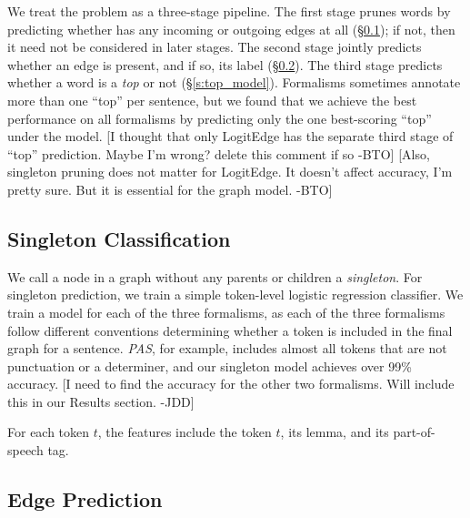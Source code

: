 \documentclass[11pt]{article}
\newcommand{\bocomment}[1]{\textcolor{Bittersweet}{[#1 -BTO]}}
\newcommand{\jdcomment}[1]{\textcolor{NavyBlue}{[#1 -JDD]}}
\begin{document}
We treat the problem as a three-stage pipeline.
The first stage prunes words by predicting whether has any incoming or
outgoing edges at all (\S\ref{s:singleton_model}); if not, then it need not be 
considered in later stages.
The second stage jointly predicts whether an edge is
present, and if so, its label (\S\ref{s:edge_model}).
The third stage predicts whether a word is a \emph{top} or not
(\S\ref{s:top_model}).
Formalisms sometimes annotate more than one ``top'' per sentence, but we
found that we achieve the best performance on all formalisms by predicting only
the one best-scoring ``top'' under the model.
\bocomment{I thought that only LogitEdge has the separate third stage of ``top'' prediction. Maybe I'm wrong? delete this comment if so}
\bocomment{Also, singleton pruning does not matter for LogitEdge.  It doesn't affect accuracy, I'm pretty sure.  But it is essential for the graph model.}


\subsection{Singleton Classification} \label{s:singleton_model}

We call a node in a graph without any parents or children a \emph{singleton}.
For singleton prediction, we train a simple token-level logistic regression
classifier.
We train a model for each of the three formalisms, as each of the three
formalisms follow different conventions determining whether a token is
included in the final graph for a sentence.
\emph{PAS}, for example, includes almost all tokens that are not
punctuation or a determiner, and our singleton model achieves over 99\%
accuracy.
\jdcomment{I need to find the accuracy for the other two formalisms. Will
include this in our Results section.}

For each token $t$, the features include
the token $t$, its lemma, and its part-of-speech tag.



\subsection{Edge Prediction} \label{s:edge_model}
\end{document}
